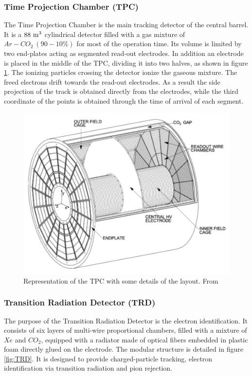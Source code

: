 \subsubsection{Time Projection Chamber (TPC)}
The Time Projection Chamber is the main tracking detector of the central barrel.
It is a $88\ \rm m^3$ cylindrical detector filled with a gas mixture of $Ar-CO_2\ (90-10 \% )$ for most of the operation time.
Its volume is limited by two end-plates acting as segmented read-out electrodes. 
In addition an electrode is placed in the middle of the TPC, dividing it into two halves, as shown in figure \ref{fig:TPC}.
The ionizing particles crossing the detector ionize the gaseous mixture.
The freed electrons drift towards the read-out electrodes.
As a result the side projection of the track is obtained directly from the electrodes, while the third coordinate of the points is obtained through the time of arrival of each segment.

\begin{figure}[!h]
\begin{center}
\includegraphics[width=0.7\linewidth]{Chapters/Introduction/Figs/tpc.pdf}
\caption{Representation of the TPC with some details of the layout. From \cite{Alme:2010}}
\label{fig:TPC}
\end{center}
\end{figure}

\subsubsection{Transition Radiation Detector (TRD)}
The purpose of the Transition Radiation Detector is the electron identification.
It consists of six layers of multi-wire proportional chambers, filled with a mixture of $Xe$ and $CO_2$, equipped with a radiator made of optical fibers embedded in plastic foam directly glued on the electrode.
The modular structure is detailed in figure \ref{fig:TRD}.
It is designed to provide charged-particle tracking, electron identification via transition radiation and pion rejection. 

